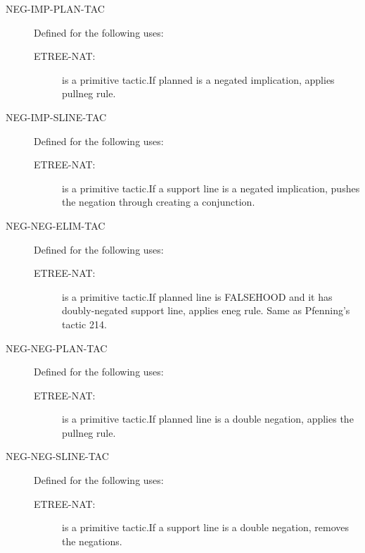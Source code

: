 \begin{description}
\begin{description}
\end{description}

\item[NEG-IMP-PLAN-TAC]  Defined for the following uses:
\begin{description}
\item[ETREE-NAT:]  is a primitive tactic.If planned is a negated implication, applies pullneg rule.

\end{description}

\item[NEG-IMP-SLINE-TAC]  Defined for the following uses:
\begin{description}
\item[ETREE-NAT:]  is a primitive tactic.If a support line is a negated implication, pushes the negation through
creating a conjunction.

\end{description}

\item[NEG-NEG-ELIM-TAC]  Defined for the following uses:
\begin{description}
\item[ETREE-NAT:]  is a primitive tactic.If planned line is FALSEHOOD and it has doubly-negated support line,
applies eneg rule.  Same as Pfenning's tactic 214.

\end{description}

\item[NEG-NEG-PLAN-TAC]  Defined for the following uses:
\begin{description}
\item[ETREE-NAT:]  is a primitive tactic.If planned line is a double negation, applies the pullneg
rule.

\end{description}

\item[NEG-NEG-SLINE-TAC]  Defined for the following uses:
\begin{description}
\item[ETREE-NAT:]  is a primitive tactic.If a support line is a double negation, removes the negations.

\end{description}


\end{description}
